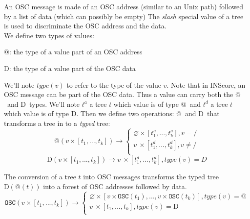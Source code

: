\documentclass[runningheads]{llncs}
\makeatletter
\newcommand{\llist}	[1]		{\ensuremath{[#1_1,...,#1_k]}}
\newcommand{\forest}	{\ensuremath{\varnothing}}
\newcommand{\toType}	{\ensuremath{\mathcal{T}}}
\newcommand{\toAddress}	{\ensuremath{\text{@}}}
\newcommand{\toOSCAddress}	{\ensuremath{\texttt{OSC}}}
\newcommand{\taddress}	{\ensuremath{\text{@}}}
\newcommand{\toData}	{\ensuremath{\text{D}}}
\newcommand{\tdata}	    {\ensuremath{\text{D}}}
\newcommand{\etc}		{\ensuremath{\text{…}}}
\makeatother
\begin{document}
An OSC message is made of an OSC address (similar to an Unix path) followed by a list of data (which can possibly be empty)
The \emph{slash} special value of a tree is used to discriminate the OSC address and the data. \\
We define two types of values: 
\begin{description}
\item \taddress : the type of a value part of an OSC address
\item \tdata : the type of a value part of the OSC data
\end{description}
We'll note $type(v)$ to refer to the type of the value $v$.
Note that in INScore, an OSC message can be part of the OSC data. Thus a value can carry both the \taddress\  and \tdata\ types.
We'll note $t^a$ a tree $t$ which value is of type \taddress\ and $t^d$ a tree $t$ which value is of type \tdata .
Then we define two operations: \toAddress\ and \toData\ that transforms a tree in to a \emph{typed} tree:
\[
    \toAddress (v \times \llist{t}) \to 
\left\{
\begin{array}{l}
	\forest \times \llist{t^a} , v = /\\
	v \ \times \llist{t^d} , v \neq / \\
\end{array}
\right.
\]
\[
    \toData (v \times \llist{t}) \to v \ \times \llist{t^d} , type(v) = D
\]

The conversion of a tree $t$ into OSC messages transforms the typed tree $\toData (\toAddress (t))$ into a forest of OSC addresses followed by data.
\[
    \toOSCAddress (v \times \llist{t}) \to
\left\{
\begin{array}{l}
	\forest \times [ v \times \toOSCAddress(t_1),\etc , v \times \toOSCAddress(t_k)] , type(v) = \taddress\\
	v \ \times \llist{t} , type(v) = \tdata \\
\end{array}
\right.
\]




\end{document}
